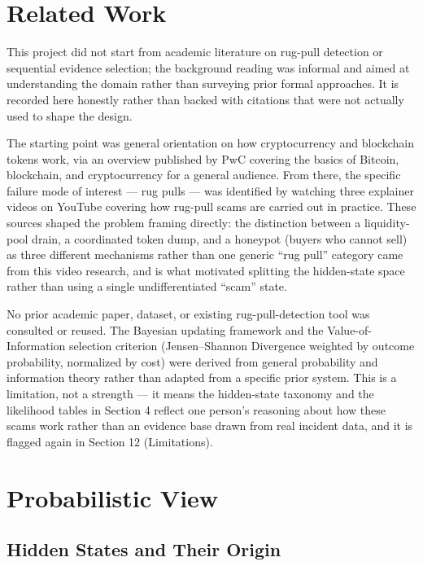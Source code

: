 \documentclass[11pt]{article}
\begin{document}
\section{Related Work}

This project did not start from academic literature on rug-pull detection or sequential evidence selection; the background reading was informal and aimed at understanding the domain rather than surveying prior formal approaches. It is recorded here honestly rather than backed with citations that were not actually used to shape the design.

The starting point was general orientation on how cryptocurrency and blockchain tokens work, via an overview published by PwC covering the basics of Bitcoin, blockchain, and cryptocurrency for a general audience. From there, the specific failure mode of interest --- rug pulls --- was identified by watching three explainer videos on YouTube covering how rug-pull scams are carried out in practice. These sources shaped the problem framing directly: the distinction between a liquidity-pool drain, a coordinated token dump, and a honeypot (buyers who cannot sell) as three different mechanisms rather than one generic ``rug pull'' category came from this video research, and is what motivated splitting the hidden-state space rather than using a single undifferentiated ``scam'' state.

No prior academic paper, dataset, or existing rug-pull-detection tool was consulted or reused. The Bayesian updating framework and the Value-of-Information selection criterion (Jensen--Shannon Divergence weighted by outcome probability, normalized by cost) were derived from general probability and information theory rather than adapted from a specific prior system. This is a limitation, not a strength --- it means the hidden-state taxonomy and the likelihood tables in Section 4 reflect one person's reasoning about how these scams work rather than an evidence base drawn from real incident data, and it is flagged again in Section 12 (Limitations).

\section{Probabilistic View}

\subsection{Hidden States and Their Origin}
\end{document}
